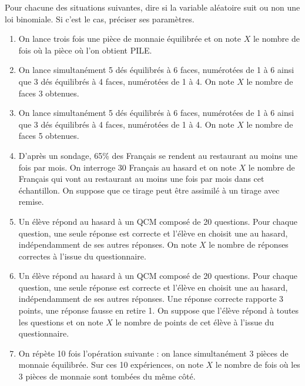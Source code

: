 \documentclass[11pt,fleqn, openany]{book} %
\begin{document}
\begin{exercise}
Pour chacune des situations suivantes, dire si la variable aléatoire  suit ou non une loi binomiale. Si c'est le cas, préciser ses paramètres.

\begin{enumerate}
\item On lance trois fois une pièce de monnaie équilibrée et on note $X$ le nombre de fois où la pièce où l'on obtient PILE.
\item On lance simultanément 5 dés équilibrés à 6 faces, numérotées de 1 à 6 ainsi que 3 dés équilibrés à 4 faces, numérotées de 1 à 4. On note $X$ le nombre de faces 3 obtenues.
\item On lance simultanément 5 dés équilibrés à 6 faces, numérotées de 1 à 6 ainsi que 3 dés équilibrés à 4 faces, numérotées de 1 à 4. On note $X$ le nombre de faces 5 obtenues.
\item D'après un sondage, 65\% des Français se rendent au restaurant au moins une fois par mois. On interroge 30 Français au hasard et on note $X$ le nombre de Français qui vont au restaurant au moins une fois par mois dans cet échantillon. On suppose que ce tirage peut être assimilé à un tirage avec remise.
\item Un élève répond au hasard à un QCM composé de 20 questions. Pour chaque question, une seule réponse est correcte et l'élève en choisit une au hasard, indépendamment de ses autres réponses. On note $X$ le nombre de réponses correctes à l'issue du questionnaire.
\item Un élève répond au hasard à un QCM composé de 20 questions. Pour chaque question, une seule réponse est correcte et l'élève en choisit une au hasard, indépendamment de ses autres réponses. Une réponse correcte rapporte 3 points, une réponse fausse en retire 1. On suppose que l'élève répond à toutes les questions et on note $X$ le nombre de points de cet élève à l'issue du questionnaire.
\item On répète 10 fois l'opération suivante : on lance simultanément 3 pièces de monnaie équilibrée. Sur ces 10 expériences, on note $X$ le nombre de fois où les 3 pièces de monnaie sont tombées du même côté.
\end{enumerate}
\end{exercise}
\end{document}
